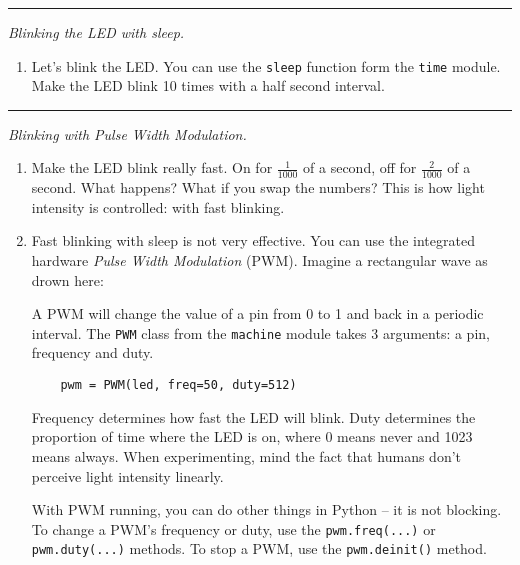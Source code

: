 \documentclass[a4paper,10pt]{article}
\newcommand\startsection[1]{
     \vspace{0.2ex}
    \hrule
    {\fontspec{Oxygen} \tiny
     \vspace{-1ex}
     \emph{#1}
     \vspace{-1.5em}
    }
}
\begin{document}
\startsection{Blinking the LED with sleep.}

\begin{enumerate}[resume]

\item Let's blink the LED. You can use the \texttt{sleep} function form the \texttt{time} module.
      Make the LED blink 10 times with a half second interval.

\end{enumerate}

\startsection{Blinking with Pulse Width Modulation.}

\begin{enumerate}[resume]

\item Make the LED blink really fast.
      On for $\frac{1}{1000}$ of a second, off for $\frac{2}{1000}$ of a second.
      What happens? What if you swap the numbers?
      This is how light intensity is controlled: with fast blinking.

\item Fast blinking with sleep is not very effective.
      You can use the integrated hardware \emph{Pulse Width Modulation} (PWM).
      Imagine a rectangular wave as drown here:

      \begin{center}
      \end{center}

      A PWM will change the value of a pin from 0 to 1 and back in a periodic interval.
      The \texttt{PWM} class from the \texttt{machine} module takes 3 arguments:
      a pin, frequency and duty.

      \texttt{~~~~pwm = PWM(led, freq=50, duty=512)}

      Frequency determines how fast the LED will blink.
      Duty determines the proportion of time where the LED is on, where 0 means never and 1023 means always.
      When experimenting, mind the fact that humans don't perceive light intensity linearly.

      With PWM running, you can do other things in Python -- it is not blocking.
      To change a PWM's frequency or duty, use the \texttt{pwm.freq(...)} or \texttt{pwm.duty(...)} methods.
      To stop a PWM, use the \texttt{pwm.deinit()} method.

\end{enumerate}
\end{document}
